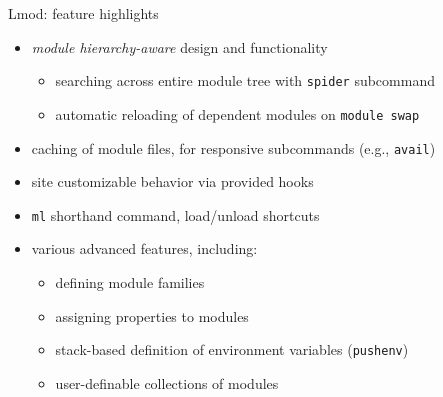 \documentclass[10pt,xcolor={usenames,dvipsnames}]{beamer}
\begin{document}
\begin{frame}{Lmod: feature highlights}
    \begin{itemize}
        \item \emph{module hierarchy-aware} design and functionality
        \begin{itemize}
            \item searching across entire module tree with \texttt{spider} subcommand
            \item automatic reloading of dependent modules on \texttt{module swap}
        \end{itemize}
        \item caching of module files, for responsive subcommands (e.g., \texttt{avail})
        \item site customizable behavior via provided hooks
        \item \texttt{ml} shorthand command, load/unload shortcuts
        \item various advanced features, including:
        \begin{itemize}
            \item defining module families
            \item assigning properties to modules
            \item stack-based definition of environment variables (\texttt{pushenv})
            \item user-definable collections of modules
        \end{itemize}
    \end{itemize}
\end{frame}

\end{document}
